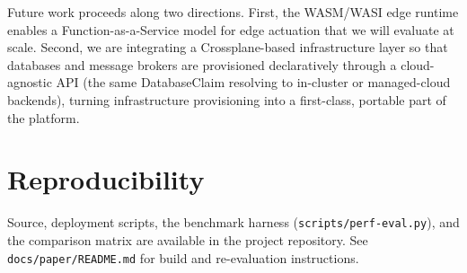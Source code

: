 \documentclass[review,12pt]{elsarticle}
\begin{document}
Future work proceeds along two directions. First, the WASM/WASI edge runtime
enables a Function-as-a-Service model for edge actuation that we will evaluate
at scale. Second, we are integrating a Crossplane-based infrastructure layer so
that databases and message brokers are provisioned declaratively through a
cloud-agnostic API (the same \textsf{DatabaseClaim} resolving to in-cluster or
managed-cloud backends), turning infrastructure provisioning into a first-class,
portable part of the platform.

\section*{Reproducibility}
Source, deployment scripts, the benchmark harness
(\texttt{scripts/perf-eval.py}), and the comparison matrix are available in the
project repository. See \texttt{docs/paper/README.md} for build and
re-evaluation instructions.



\end{document}
